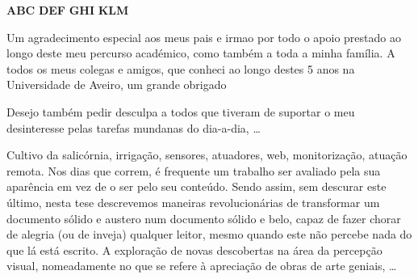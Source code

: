 \documentclass[11pt,twoside,a4paper]{report}
\begin{document}
\TitlePage
  \vspace*{55mm}
       {}
       {\textbf{ABC}}
  \vspace*{5mm}
       {\textbf{DEF}}
  \vspace*{5mm}
  \TEXT{}
       {\textbf{GHI}}
  \vspace*{5mm}
  \TEXT{}
       {\textbf{KLM}}
\EndTitlePage
\titlepage\ \endtitlepage %

\TitlePage
  \vspace*{55mm}
       {Um agradecimento especial aos meus pais e irmao por todo o apoio	prestado ao longo deste meu percurso académico, como também a toda a minha família.
       	A todos os meus colegas e amigos, que conheci ao longo destes 5 anos na Universidade de Aveiro, um grande obrigado}
    

    
  \TEXT{}
       {Desejo tamb\'em pedir desculpa a todos que tiveram de suportar o meu desinteresse pelas
        tarefas mundanas do dia-a-dia, \ldots}
\EndTitlePage
\titlepage\ \endtitlepage %

\TitlePage
	\vspace*{55mm}
	{Cultivo da salicórnia, irrigação, sensores, atuadores, web, monitorização, atuação remota.}
  	\vspace*{5mm}
       {Nos dias que correm, \'e frequente um trabalho ser avaliado pela sua apar\^encia em vez de
        o ser pelo seu conte\'udo. Sendo assim, sem descurar este \'ultimo, nesta tese descrevemos
        maneiras revolucion\'arias de transformar um documento s\'olido e austero num documento
        s\'olido e belo, capaz de fazer chorar de alegria (ou de inveja) qualquer leitor, mesmo
        quando este n\~ao percebe nada do que l\'a est\'a escrito.}
  \TEXT{}
       {A explora\c c\~ao de novas descobertas na \'area da percep\c c\~ao visual, nomeadamente
        no que se refere \`a aprecia\c c\~ao de obras de arte geniais, \ldots}
\EndTitlePage
\titlepage\ \endtitlepage %
\end{document}
